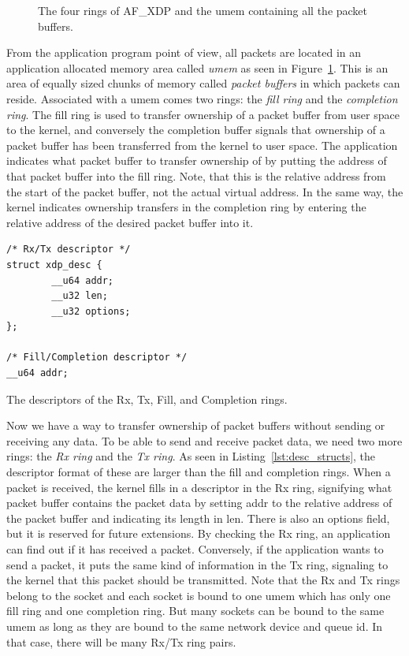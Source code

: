 \documentclass[9pt,numbers,reprint]{sigplanconf}
\begin{document}
\begin{figure}[ht]
\resizebox{\textwidth}{!}{}
  \caption{The four rings of AF\_XDP and the umem containing all the
    packet buffers.}
  \label{fig:queues_and_umem}
\end{figure}

From the application program point of view, all packets are located in
an application allocated memory area called \emph{umem} as seen in
Figure~\ref{fig:queues_and_umem}. This is an area of equally sized
chunks of memory called \emph{packet buffers} in which packets can
reside. Associated with a umem comes two rings: the \emph{fill ring}
and the \emph{completion ring}. The fill ring is used to transfer
ownership of a packet buffer from user space to the kernel, and
conversely the completion buffer signals that ownership of a packet
buffer has been transferred from the kernel to user space. The
application indicates what packet buffer to transfer ownership of by
putting the address of that packet buffer into the fill ring. Note,
that this is the relative address from the start of the packet buffer,
not the actual virtual address. In the same way, the kernel indicates
ownership transfers in the completion ring by entering the relative
address of the desired packet buffer into it.

\begin{listing}[p]
\begin{verbatim}
/* Rx/Tx descriptor */
struct xdp_desc {
        __u64 addr;
        __u32 len;
        __u32 options;
};

/* Fill/Completion descriptor */
__u64 addr;
\end{verbatim}
\caption{The descriptors of the Rx, Tx, Fill, and Completion rings.}
\label{lst:desc_structs}
\end{listing}

Now we have a way to transfer ownership of packet buffers without
sending or receiving any data. To be able to send and receive packet data, we
need two more rings: the \emph{Rx ring} and the \emph{Tx ring}. As
seen in Listing~\ref{lst:desc_structs}, the descriptor format of these
are larger than the fill and completion rings. When a packet is
received, the kernel fills in a descriptor in the Rx ring, signifying
what packet buffer contains the packet data by setting addr to the
relative address of the packet buffer and indicating its
length in len. There is also an options field, but it is reserved for
future extensions. By checking the Rx ring, an application can find
out if it has received a packet. Conversely, if the application wants
to send a packet, it puts the same kind of information in the Tx
ring, signaling to the kernel that this packet should be
transmitted. Note that the Rx and Tx rings belong to the socket and
each socket is bound to one umem which has only one fill ring and one
completion ring. But many sockets can be bound to the same umem as
long as they are bound to the same network device and queue id. In
that case, there will be many Rx/Tx ring pairs.
\end{document}
